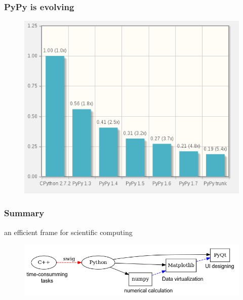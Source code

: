 \documentclass[compress=true]{beamer}
\begin{document}
\begin{frame}
	\frametitle{PyPy is evolving}
	\begin{figure}
		\includegraphics[height=0.65\textheight]{pypy_evolving.png}
	\end{figure}
\end{frame}
		
\begin{frame}
	\frametitle{Summary}
	an efficient frame for scientific computing
	\begin{figure}
		\includegraphics[height=0.3\textheight]{summary.png}
	\end{figure}
\end{frame}
\end{document}

